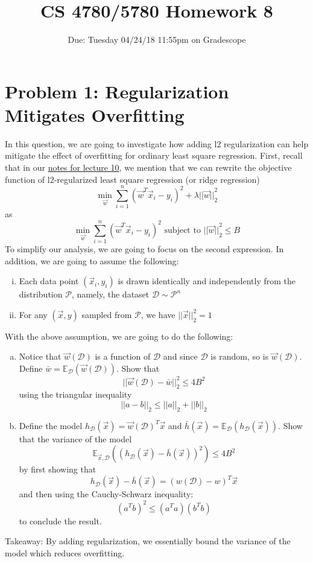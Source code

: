 \documentclass{article}
\title{CS 4780/5780 Homework 8\vspace{-10pt}}
\author{Due: Tuesday 04/24/18 11:55pm on Gradescope}
\date{}
\begin{document}
    \maketitle
    \section*{Problem 1: Regularization Mitigates Overfitting}
    In this question, we are going to investigate how adding l2 regularization 
    can help mitigate the effect of overfitting for ordinary least square regression. 
    First, recall that in our \href{http://www.cs.cornell.edu/courses/cs4780/2018sp/lectures/lecturenote10.html}{notes for lecture 10}, we mention that we can rewrite the objective 
    function of l2-regularized least square regression (or ridge regression)
    $$\min_{\vec{w}} \sum_{i=1}^n (\vec{w}^T \vec{x}_i - y_i) ^ 2 + \lambda {||\vec{w}||}_2^2$$ as 
    $$\min_{\vec{w}} \sum_{i=1}^n (\vec{w}^T \vec{x}_i - y_i) ^ 2  \text{ subject to } {||\vec{w}||}_2^2 \leq B$$
    To simplify our analysis, we are going to focus on the second expression. 
    In addition, we are going to assume the following:
    \begin{enumerate}[(i)]
        \item Each data point $(\vec{x}_i, y_i)$ is drawn identically and independently from the distribution $\mathcal{P}$, namely, the dataset $\mathcal{D} \sim \mathcal{P}^n$ 
        \item For any $(\vec{x},y)$ sampled from $\mathcal{P}$, we have $||\vec{x}||_2^2 =  1$ 
    \end{enumerate}
    With the above assumption, we are going to do the following: 
    \begin{enumerate}[(a)]
        \item Notice that $\vec{w}(\mathcal{D})$ is a function of $\mathcal{D}$ and since $\mathcal{D}$ is random, so is $\vec{w}(\mathcal{D})$. Define $\bar{w} = \mathbb{E}_{\mathcal{D}}(\vec{w}(\mathcal{D}))$. Show that 
        $$||\vec{w}(\mathcal{D}) - \bar{w} ||_2^2 \leq 4B^2 $$
        using the triangular inequality
        $$||a-b||_2 \leq ||a||_2 + ||b||_2$$
        \item Define the model $h_\mathcal{D}(\vec{x}) = \vec{w}(\mathcal{D}) ^T \vec{x}$ and $\bar{h}(\vec{x}) = \mathbb{E}_{\mathcal{D}} (h_\mathcal{D}(\vec{x}))$. Show that the variance of the model 
        $$\mathbb{E}_{\vec{x}, \mathcal{D}}((h_\mathcal{D}(\vec{x}) - \bar{h}(\vec{x})) ^ 2) \leq 4B^2$$ by first showing that $$h_\mathcal{D}(\vec{x}) - \bar{h}(\vec{x}) = (w(\mathcal{D}) - w) ^T \vec{x}$$ and then using the Cauchy-Schwarz inequality: $$(a^Tb)^2 \leq (a^Ta )(b^Tb)$$ to conclude the result. 
    \end{enumerate} 
    Takeaway: By adding regularization, we essentially bound the variance of the model which reduces overfitting. 
    
\end{document}
